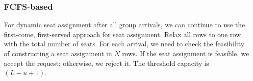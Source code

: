 
\subsubsection{FCFS-based}\label{FCFS-based}
For dynamic seat assignment after all group arrivals, we can continue to use the first-come, first-served approach for seat assignment. Relax all rows to one row with the total number of seats. For each arrival, we need to check the feasibility of constructing a seat assignment in $N$ rows. If the seat assignment is feasible, we accept the request; otherwise, we reject it. The threshold capacity is $(L -u +1)$.













